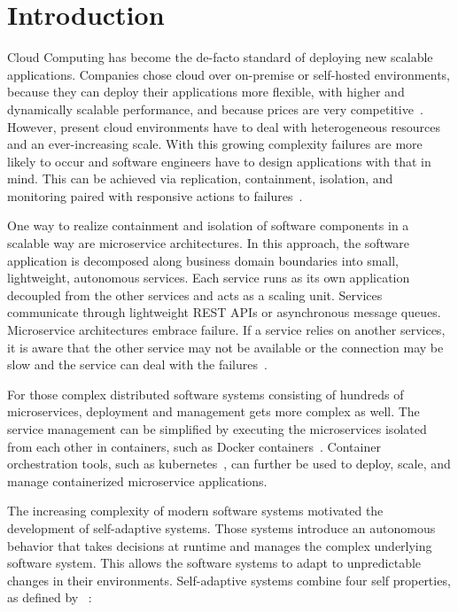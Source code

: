 
\section{Introduction}\label{sec:introduction}
  Cloud Computing has become the de-facto standard of deploying new scalable applications.
  Companies chose cloud over on-premise or self-hosted environments, because they can deploy their applications more flexible, with higher and dynamically scalable performance, and because prices are very competitive~\cite{ToffettiMicroservices}.
  However, present cloud environments have to deal with heterogeneous resources and an ever-increasing scale.
  With this growing complexity failures are more likely to occur and software engineers have to design applications with that in mind.
  This can be achieved via replication, containment, isolation, and monitoring paired with responsive actions to failures~\cite{reactivemanifesto}.

  One way to realize containment and isolation of software components in a scalable way are microservice architectures.
  In this approach, the software application is decomposed along business domain boundaries into small, lightweight, autonomous services.
  Each service runs as its own application decoupled from the other services and acts as a scaling unit.
  Services communicate through lightweight REST APIs or asynchronous message queues.
  Microservice architectures embrace failure.
  If a service relies on another services, it is aware that the other service may not be available or the connection may be slow and the service can deal with the failures~\cite{microservices}.

  For those complex distributed software systems consisting of hundreds of microservices, deployment and management gets more complex as well.
  The service management can be simplified by executing the microservices isolated from each other in containers, such as Docker containers~\cite{docker}.
  Container orchestration tools, such as \gls{kubernetes}~\cite{kubernetes}, can further be used to deploy, scale, and manage containerized microservice applications.

  The increasing complexity of modern software systems motivated the development of self-adaptive systems.
  Those systems introduce an autonomous behavior that takes decisions at runtime and manages the complex underlying software system.
  This allows the software systems to adapt to unpredictable changes in their environments.
  Self-adaptive systems combine four self properties, as defined by \citeauthor{Ganek}~\cite{Ganek}:


